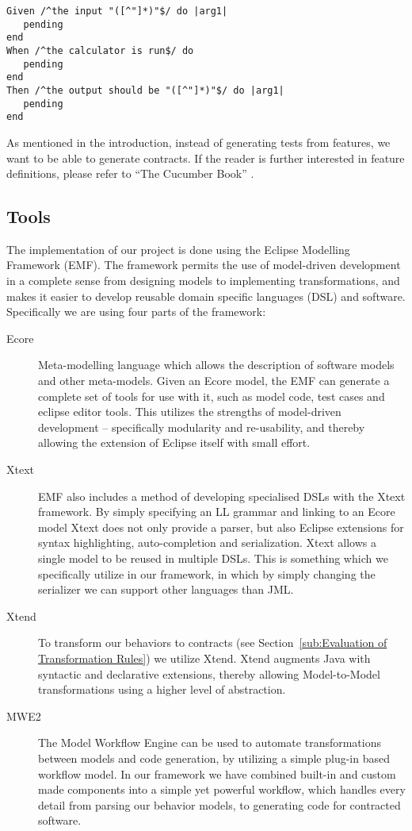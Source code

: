 \begin{lstlisting}[caption={Sample Cucumber Output},label={lst:cucumberoutput}]
Given /^the input "([^"]*)"$/ do |arg1|
   pending
end
When /^the calculator is run$/ do
   pending
end
Then /^the output should be "([^"]*)"$/ do |arg1|
   pending
end
\end{lstlisting}

As mentioned in the introduction, instead of generating tests from features, we want to be able to generate contracts. 
If the reader is further interested in feature definitions, please refer to “The Cucumber Book” \cite{hellesoy2012}.


\subsection{Tools}
The implementation of our project is done using the Eclipse Modelling Framework (EMF).
The framework permits the use of model-driven development in a complete sense from designing models to implementing transformations, and makes
it easier to develop reusable domain specific languages (DSL) and software. Specifically we are using four parts of the framework:
\begin{description}
\item[Ecore] Meta-modelling language which allows the description of software models and other meta-models. Given an Ecore model, the EMF can
  generate a complete set of tools for use with it, such as model code, test cases and eclipse editor tools. This utilizes the strengths
  of model-driven development -- specifically modularity and re-usability, and thereby allowing the extension of Eclipse itself with small effort.
\item[Xtext] EMF also includes a method of developing specialised DSLs with the Xtext framework. By simply specifying an LL grammar and linking to an Ecore model
  Xtext does not only provide a parser, but also Eclipse extensions for syntax highlighting, auto-completion and serialization.
  Xtext allows a single model to be reused in multiple DSLs. This is something which we specifically utilize in our framework,
  in which by simply changing the serializer we can support other languages than JML.
\item[Xtend] To transform our behaviors to contracts (see Section~\ref{sub:Evaluation of Transformation Rules}) we utilize Xtend.
  Xtend augments Java with syntactic and declarative extensions, thereby allowing Model-to-Model transformations using a higher level of abstraction.
\item[MWE2] The Model Workflow Engine can be used to automate transformations between models and code generation, by utilizing a simple plug-in based
  workflow model. In our framework we have combined built-in and custom made components into a simple yet powerful workflow, which handles every detail
  from parsing our behavior models, to generating code for contracted software.
\end{description}
